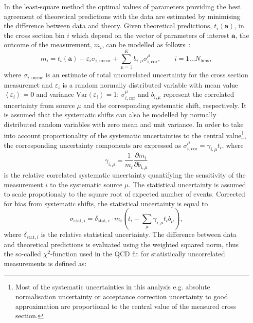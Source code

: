 In the least-square method the optimal values of parameters providing the best agreement of theoretical predictions with the data are estimated by minimising the difference between data and theory. Given theoretical predictions, $t_i\left( \mathbf{a} \right)$, in the cross section bin $i$ which depend on the vector of parameters of interest $\mathbf{a}$, the outcome of the measurement, $m_i$, can be modelled as follows~\cite{Stump:2001gu,Botje:2001fx}:
\begin{equation}
 m_i = t_i\left( \mathbf{a} \right) + \varepsilon_{i} \sigma_{i,\text{uncor}} + \sum_{\mu=1}^{K}{b_{i,\mu}\sigma_{i,\text{cor}}^\mu}, \qquad i=1\ldots N_\text{bins},
\end{equation}
where $\sigma_{i,\text{uncor}}$ is an estimate of total uncorrelated uncertainty for the cross section measuremet and $\varepsilon_{i}$ is a random normally distributed variable with mean value $\left\langle \varepsilon_{i}\right\rangle = 0$ and variance $\text{Var}\left( \varepsilon_{i}\right) = 1$; $\sigma_{i,\text{cor}}^\mu$ and $b_{i,\mu}$ represent the correlated uncertainty from source $\mu$ and the corresponding systematic shift, respectively. It is assumed that the systematic shifts can also be modelled by normally distributed random variables with zero mean and unit variance. In order to take into account proportionality of the systematic uncertainties to the central value\footnote{Most of the systematic uncertainties in this analysis e.g. absolute normalisation uncertainty or acceptance correction uncertainty to good approximation are proportional to the central value of the measured cross section.}, the corresponding uncertainty components are expressed as $\sigma_{i,\text{cor}}^\mu = \gamma_{i,\mu}t_i$, where 
\begin{equation}
\gamma_{i,\mu}=\frac{1}{{m_i}} \frac{\partial m_i}{\partial b_{i,\mu}}
\end{equation}
is the relative correlated systematic uncertainty quantifying the sensitivity of the measurement $i$ to the systematic source $\mu$. The statistical uncertainty is assumed to scale propotionaly to the square root of expected number of events. Corrected for bias from systematic shifts, the statistical uncertainty is equal to
\begin{equation}
 \sigma_{\text{stat},i} = \delta_{\text{stat},i}\cdot m_i\left( t_i - \sum_\mu\gamma_{i,\mu}t_ib_\mu \right),
\end{equation}
where $\delta_{\text{stat},i}$ is the relative statistical uncertainty. The difference between data and theoretical predictions is evaluated using the weighted squared norm, thus the so-called $\chi^2$-function used in the QCD fit  for statistically uncorrelated measurements is defined as:
